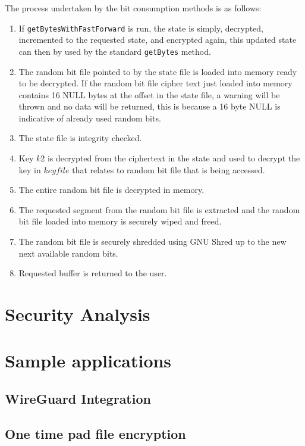 \documentclass{paper}
\begin{document}
				The process undertaken by the bit consumption methods is as follows:
				\begin{enumerate}
					\setlength\itemsep{-0.3em}
					\item If \texttt{getBytesWithFastForward} is run, the state is simply, decrypted, incremented to the requested state, and encrypted again, this updated state can then by used by the standard \texttt{getBytes} method.
					\item The random bit file pointed to by the state file is loaded into memory ready to be decrypted. If the random bit file cipher text just loaded into memory contains 16 NULL bytes at the offset in the state file, a warning will be thrown and no data will be returned, this is because a 16 byte NULL is indicative of already used random bits.
					\item The state file is integrity checked.
					\item Key $\mathit{k2}$ is decrypted from the ciphertext in the state and used to decrypt the key in $\mathit{keyfile}$ that relates to random bit file that is being accessed.
					\item The entire random bit file is decrypted in memory.
					\item The requested segment from the random bit file is extracted and the random bit file loaded into memory is securely wiped and freed.
					\item The random bit file is securely shredded using GNU Shred up to the new next available random bits.
					\item Requested buffer is returned to the user.
				\end{enumerate}
				
				
		
		\section{Security Analysis}
		\section{Sample applications}
			\subsection{WireGuard Integration}
			\subsection{One time pad file encryption}
		
						
\end{document}
